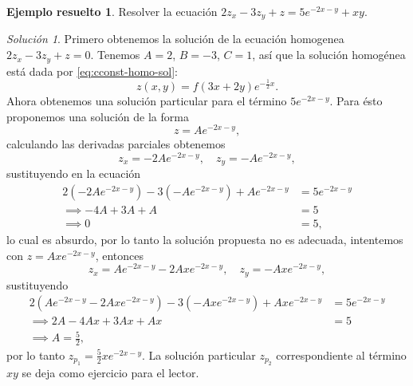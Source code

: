 \documentclass[11pt,letterpaper,draft]{report}
\theoremstyle{plain}
\theoremstyle{definition}
\newtheorem{solved}[theorem]{Ejemplo resuelto}
\theoremstyle{remark}
\newtheorem*{solution}{Solución}
\newcommand\<{\langle}
\renewcommand\>{\rangle}
\begin{document}
\begin{solved}
  Resolver la ecuación $2 z_x - 3 z_y + z = 5 e^{-2x - y} + xy$.
  \begin{solution}
    Primero obtenemos la solución de la ecuación
    homogenea $2 z_x - 3z_y + z = 0$.
    Tenemos \(A=2\), \(B=-3\), \(C=1\),
    así que la solución homogénea está dada por
    \eqref{eq:cconst-homo-sol}:
    \[
    z(x,y) = f(3x + 2y) e^{-\frac{1}{2}x}.
    \] 
    Ahora obtenemos una solución particular para el
    término $5e^{-2x-y}$. Para ésto proponemos una
    solución de la forma
    \[
    z = A e^{-2x-y},
    \] calculando las derivadas parciales obtenemos
    \[
    z_x = -2 A e^{-2x-y}, \quad z_y = -A e^{-2x-y},
    \] sustituyendo en la ecuación
    \begin{align*}
      2\left(-2Ae^{-2x-y}\right) -
      3\left(-Ae^{-2x-y}\right) + Ae^{-2x-y} &=
      5e^{-2x-y}\\
      \implies -4A + 3A + A &= 5\\
      \implies 0 &= 5,
    \end{align*}
    lo cual es absurdo, por lo tanto la solución
    propuesta no es adecuada, intentemos con $z = A x
    e^{-2x-y}$, entonces
    \[
    z_x = Ae^{-2x-y} - 2Axe^{-2x-y}, \quad z_y =
    -Axe^{-2x-y},
    \] sustituyendo
    \begin{align*}
      2\left(Ae^{-2x-y}-2Axe^{-2x-y}\right) -
      3\left(-Axe^{-2x-y}\right) + Axe^{-2x-y} &=
      5e^{-2x-y}\\
      \implies 2A - 4Ax + 3Ax + Ax &= 5\\
      \implies A = \frac{5}{2},
    \end{align*}
    por lo tanto $z_{p_1} = \frac{5}{2} x e^{-2x-y}$. La
    solución particular $z_{p_2}$ correspondiente al
    término $xy$ se deja como ejercicio para el lector.
  \end{solution}
\end{solved}
\end{document}
